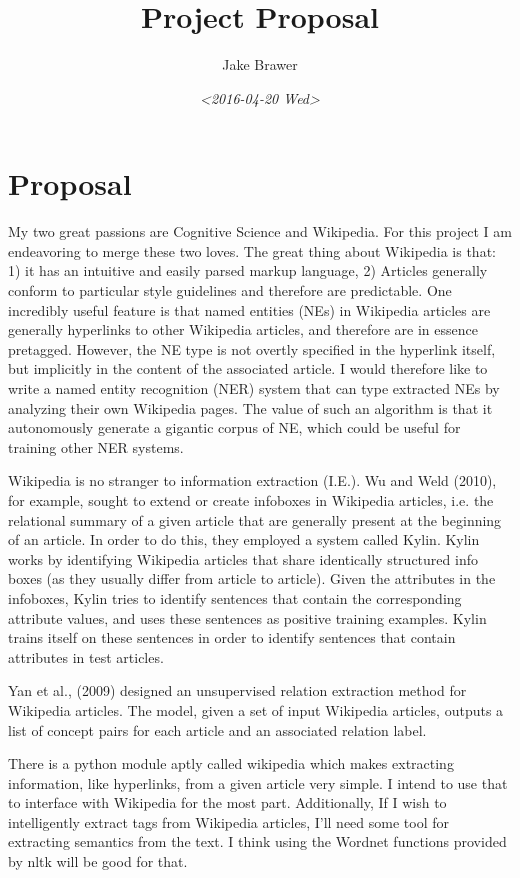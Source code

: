 \documentclass[11pt]{article}
\author{Jake Brawer}
\date{\textit{<2016-04-20 Wed>}}
\title{Project Proposal}
\begin{document}
\maketitle

\section{Proposal}
\label{sec:orgheadline1}
My two great passions are Cognitive Science and Wikipedia. For this project I am endeavoring to merge these two loves. The great thing about Wikipedia is that: 1) it has an intuitive and easily parsed markup language, 2) Articles generally conform to particular style guidelines and therefore are predictable. One incredibly useful feature is that named entities (NEs) in Wikipedia articles are generally hyperlinks to other Wikipedia articles, and therefore are in essence pretagged. However, the NE type is not overtly specified in the hyperlink itself, but implicitly in the content of the associated article. I would therefore like to write a named entity recognition (NER) system that can type extracted NEs by analyzing their own Wikipedia pages. The value of such an algorithm is that it autonomously generate a gigantic corpus of NE, which could be useful for training other NER systems. 

Wikipedia is no stranger to information extraction (I.E.). Wu and Weld (2010), for example, sought to extend or create infoboxes in Wikipedia articles, i.e. the relational summary of a given article that are generally present at the beginning of an article. In order to do this, they employed a system called Kylin. Kylin works by identifying Wikipedia articles that share identically structured info boxes (as they usually differ from article to article). Given the attributes in the infoboxes, Kylin tries to identify sentences that contain the corresponding attribute values, and uses these sentences as positive training examples. Kylin trains itself on these sentences in order to identify sentences that contain attributes in test articles.

Yan et al., (2009) designed an unsupervised relation extraction method for Wikipedia articles. The model, given a set of input Wikipedia articles, outputs a list of concept pairs for each article and an associated relation label. 

There is a python module aptly called wikipedia which makes extracting information, like hyperlinks, from a given article very simple. I intend to use that to interface with Wikipedia for the most part. Additionally, If I wish to intelligently extract tags from Wikipedia articles, I'll need some tool for extracting semantics from the text. I think using the Wordnet functions provided by nltk will be good for that.
\end{document}
